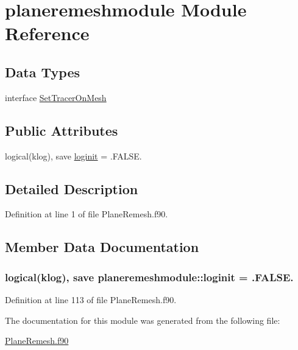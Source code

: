 \hypertarget{classplaneremeshmodule}{\section{planeremeshmodule Module Reference}
\label{classplaneremeshmodule}
}
\subsection*{Data Types}
\begin{DoxyCompactItemize}
\item 
interface \hyperlink{interfaceplaneremeshmodule_1_1SetTracerOnMesh}{Set\+Tracer\+On\+Mesh}
\end{DoxyCompactItemize}
\subsection*{Public Attributes}
\begin{DoxyCompactItemize}
\item 
logical(klog), save \hyperlink{classplaneremeshmodule_a4c800ef621531aabb58336302f8ada3d}{loginit} = .F\+A\+L\+S\+E.
\end{DoxyCompactItemize}


\subsection{Detailed Description}


Definition at line 1 of file Plane\+Remesh.\+f90.



\subsection{Member Data Documentation}
\hypertarget{classplaneremeshmodule_a4c800ef621531aabb58336302f8ada3d}{
\subsubsection[{loginit}]{\setlength{\rightskip}{0pt plus 5cm}logical(klog), save planeremeshmodule\+::loginit = .F\+A\+L\+S\+E.}}\label{classplaneremeshmodule_a4c800ef621531aabb58336302f8ada3d}


Definition at line 113 of file Plane\+Remesh.\+f90.



The documentation for this module was generated from the following file\+:\begin{DoxyCompactItemize}
\item 
\hyperlink{PlaneRemesh_8f90}{Plane\+Remesh.\+f90}\end{DoxyCompactItemize}
